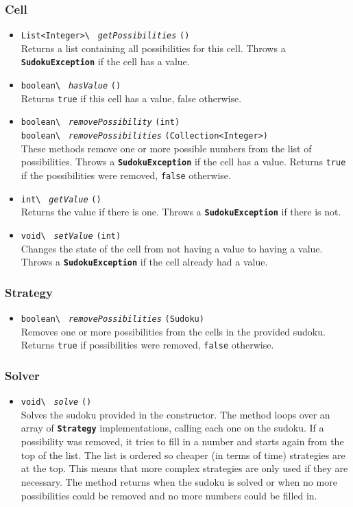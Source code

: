 \documentclass[11pt, a4paper, fleqn]{article}
\newcommand{\class}[1]{{\color{class}\textbf{\lstinline{#1}}}}
\newcommand{\method}[3]{%
\lstinline{#1\ }%
{\color{method}\textit{\lstinline{#2}}}%
\lstinline{(#3)}%
}
\newcommand{\java}[1]{\lstinline{#1}}
\begin{document}
\subsubsection{Cell}
\begin{itemize}
\item \method{List<Integer>}{getPossibilities}{}\\
Returns a list containing all possibilities for this cell. Throws a \class{SudokuException} if
the cell has a value.
\item \method{boolean}{hasValue}{}\\
Returns \java{true} if this cell has a value, false otherwise.
\item \method{boolean}{removePossibility}{int}\\
      \method{boolean}{removePossibilities}{Collection<Integer>}\\
These methods remove one or more possible numbers from the list of possibilities. Throws a
\class{SudokuException} if the cell has a value. Returns \java{true} if the possibilities were removed,
\java{false} otherwise.
\item \method{int}{getValue}{}\\
Returns the value if there is one. Throws a \class{SudokuException} if there is not.
\item \method{void}{setValue}{int}\\
Changes the state of the cell from not having a value to having a value. Throws a \class{SudokuException}
if the cell already had a value.
\end{itemize}
\subsubsection{Strategy}
\begin{itemize}
\item \method{boolean}{removePossibilities}{Sudoku}\\
Removes one or more possibilities from the cells in the provided sudoku. Returns \java{true} if
possibilities were removed, \java{false} otherwise.
\end{itemize}
\subsubsection{Solver}
\begin{itemize}
\item \method{void}{solve}{}\\
Solves the sudoku provided in the constructor. The method loops over an array of \class{Strategy}
implementations, calling each one on the sudoku. If a possibility was removed, it tries to fill
in a number and starts again from the top of the list. The list is ordered so cheaper (in terms of
time) strategies are at the top. This means that more complex strategies are only used if they are
necessary. The method returns when the sudoku is solved or when no more possibilities could be removed
and no more numbers could be filled in.
\end{itemize}
\end{document}
